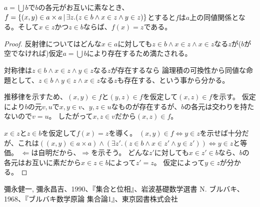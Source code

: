 \documentclass[uplatex,papersize,dvipdfmx]{jsarticle}
\begin{document}
    \begin{theorem}
      $a = \bigcup b$で$b$の各元がお互いに素なとき、$f = \{ (x, y) \in a \times a \, | \, \exists z. (z \in b \land x \in z \land y \in z) \}$とすると$f$は$a$上の同値関係となる。そして$x \in z$かつ$z \in b$ならば、$f(x) = z$である。
      \begin{proof}
        反射律についてはどんな$x \in a$に対しても$z \in b \land x \in z \land x \in z$なる$z$が($b$が空でなければ)仮定$a = \bigcup b$により存在するため満たされる。

        対称律は$z \in b \land x \in z \land y \in z$なる$z$が存在するなら
        論理積の可換性から同値な命題として、$z \in b \land y \in z \land x \in z$なる$z$も存在する、という事から分かる。

        推移律を示すため、$(x, y) \in f$と$(y, z) \in f$を仮定して$(x, z) \in f$を示す。
        仮定により$b$の元$v, u$で$x, y \in v$、$y, z \in u$なものが存在するが、$b$の各元は交わりを持たないので$v = u$。
        したがって$x, z \in v$だから$(x, z) \in f$。

        $x \in z $と$z \in b$を仮定して$f(x) = z$を導く。
        $(x, y) \in f \Leftrightarrow y \in z$を示せば十分だが、これは$((x, y) \in a \times a) \land (\exists z'. (z \in b \land x \in z' \land y \in z')) \Leftrightarrow y \in z$と等価。
        $\Leftarrow$は自明だから、$\Rightarrow$を示そう。
        どんな$z'$に対しても$x \in z' \in b$なら、$b$の各元はお互いに素だから$x \in z \in b$によって$z' = z$。
        仮定によって$y \in z$が分かる。
      \end{proof}
    \end{theorem}
  \begin{thebibliography}{99}
      彌永健一, 彌永昌吉、1990、『集合と位相』、岩波基礎数学選書
      N. ブルバキ、1968、『ブルバキ数学原論 集合論1』、東京図書株式会社
  \end{thebibliography}
\end{document}
